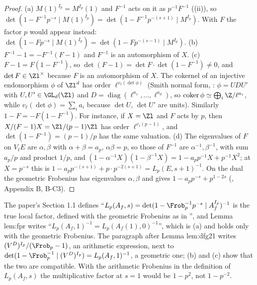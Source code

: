 \begin{proof}
(a) $M(1)^{I_p}=M^{I_p}(1)$ and $F^{-1}$ acts on it as $p^{-1}F^{-1}$ ((ii)), so $\det(1-F^{-1}p^{-s}\mid M(1)^{I_p})=\det(1-F^{-1}p^{-(s+1)}\mid M^{I_p})$.
With $F$ the factor $p$ would appear instead: $\det(1-Fp^{-s}\mid M(1)^{I_p})=\det(1-Fp^{-(s-1)}\mid M^{I_p})$. (b) $F^{-1}-1=-F^{-1}(F-1)$ and $F^{-1}$ is an
automorphism of $X$. (c) $F-1=F(1-F^{-1})$, so $\det(F-1)=\det F\cdot\det(1-F^{-1})\ne0$, and $\det F\in\Zl^\times$ because $F$ is an automorphism of $X$. The
cokernel of an injective endomorphism $\phi$ of $\Zl^d$ has order $\ell^{v_\ell(\det\phi)}$ (Smith normal form, : $\phi=UDU'$ with $U,U'\in\GL_d(\Zl)$ and
$D=\operatorname{diag}(\ell^{a_1},\dots,\ell^{a_d})$, so $\operatorname{coker}\phi\simeq\bigoplus_i\Z/\ell^{a_i}$, while $v_\ell(\det\phi)=\sum_ia_i$ because $\det U$, $\det U'$ are units). Similarly $1-F=-F(1-F^{-1})$.
For instance, if $X=\Zl$ and $F$ acts by $p$, then $X/(F-1)X=\Zl/(p-1)\Zl$ has order $\ell^{v_\ell(p-1)}$, and $\det(1-F^{-1})=(p-1)/p$ has the same valuation. (d) The
eigenvalues of $F$ on $V_\ell E$ are $\alpha,\beta$ with $\alpha+\beta=a_p$, $\alpha\beta=p$, so those of $F^{-1}$ are $\alpha^{-1},\beta^{-1}$, with sum $a_p/p$ and product
$1/p$, and $(1-\alpha^{-1}X)(1-\beta^{-1}X)=1-a_pp^{-1}X+p^{-1}X^2$; at $X=p^{-s}$ this is $1-a_pp^{-(s+1)}+p\cdot p^{-2(s+1)}=L_p(E,s+1)^{-1}$. On the dual the
geometric Frobenius has eigenvalues $\alpha,\beta$ and gives $1-a_pp^{-s}+p^{1-2s}$ (, Appendix B, B-C3).
\end{proof}

\begin{paperlink}
The paper's Section 1.1 defines ``$L_p(A_f,s)=\det(1-\Frob_p^{-1}p^{-s}\mid A_f^{I_p})^{-1}$ is the true local factor, defined with the geometric
Frobenius as in \cite[\S1.1.1]{DFG04}'', and Lemma lem:fpr writes ``$L_p(A_f,1)^{-1}=L_p(A_f(1),0)^{-1}$'', which is (a) and holds only with the
geometric Frobenius. The paragraph after Lemma lem:dfg21 writes $(V^D)^{I_p}/(\Frob_p-1)$, an arithmetic expression, next to
$\det(1-\Frob_p^{-1}\mid(V^D)^{I_p})=L_p(A_f,1)^{-1}$, a geometric one; (b) and (c) show that the two are compatible. With the arithmetic Frobenius in the
definition of $L_p(A_f,s)$ the multiplicative factor at $s=1$ would be $1-p^2$, not $1-p^{-2}$.
\end{paperlink}

